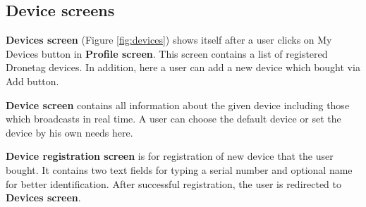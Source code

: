 \subsection{Device screens}\label{subsec:device-screens}
\textbf{Devices screen} (Figure \ref{fig:devices}) shows itself after a user clicks on My Devices button in \textbf{Profile screen}.
This screen contains a list of registered Dronetag devices.
In addition, here a user can add a new device which bought via Add button.

\textbf{Device screen} contains all information about the given device including those which broadcasts in real time.
A user can choose the default device or set the device by his own needs here.

\textbf{Device registration screen} is for registration of new device that the user bought.
It contains two text fields for typing a serial number and optional name for better identification.
After successful registration, the user is redirected to \textbf{Devices screen}.
